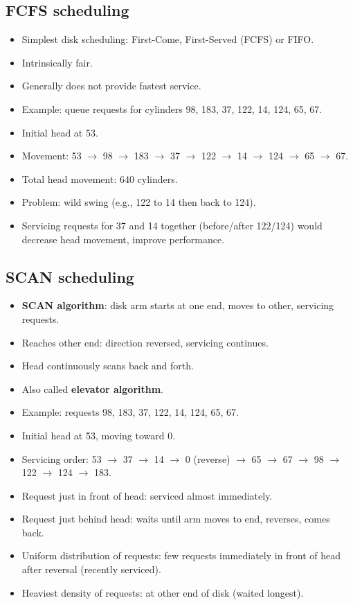 \subsection{FCFS scheduling}
\begin{itemize}
    \item Simplest disk scheduling: First-Come, First-Served (FCFS) or FIFO.
    \item Intrinsically fair.
    \item Generally does not provide fastest service.
    \item Example: queue requests for cylinders 98, 183, 37, 122, 14, 124, 65, 67.
    \item Initial head at 53.
    \item Movement: 53 $\to$ 98 $\to$ 183 $\to$ 37 $\to$ 122 $\to$ 14 $\to$ 124 $\to$ 65 $\to$ 67.
    \item Total head movement: 640 cylinders.
    \item Problem: wild swing (e.g., 122 to 14 then back to 124).
    \item Servicing requests for 37 and 14 together (before/after 122/124) would decrease head movement, improve performance.
\end{itemize}

\subsection{SCAN scheduling}
\begin{itemize}
    \item \textbf{SCAN algorithm}: disk arm starts at one end, moves to other, servicing requests.
    \item Reaches other end: direction reversed, servicing continues.
    \item Head continuously scans back and forth.
    \item Also called \textbf{elevator algorithm}.
    \item Example: requests 98, 183, 37, 122, 14, 124, 65, 67.
    \item Initial head at 53, moving toward 0.
    \item Servicing order: 53 $\to$ 37 $\to$ 14 $\to$ 0 (reverse) $\to$ 65 $\to$ 67 $\to$ 98 $\to$ 122 $\to$ 124 $\to$ 183.
    \item Request just in front of head: serviced almost immediately.
    \item Request just behind head: waits until arm moves to end, reverses, comes back.
    \item Uniform distribution of requests: few requests immediately in front of head after reversal (recently serviced).
    \item Heaviest density of requests: at other end of disk (waited longest).
\end{itemize}

